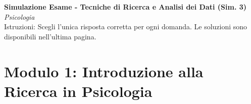 \documentclass[12pt, a4paper]{article}
\begin{document}
\begin{center}
    \Large\textbf{Simulazione Esame - Tecniche di Ricerca e Analisi dei Dati (Sim. 3)} \\
    \vspace{0.2cm}
    \large\textit{Psicologia} \\
    \vspace{0.5cm}
    \normalsize{Istruzioni: Scegli l'unica risposta corretta per ogni domanda. Le soluzioni sono disponibili nell'ultima pagina.}
\end{center}
\vspace{1cm}

\section*{Modulo 1: Introduzione alla Ricerca in Psicologia}
\end{document}
